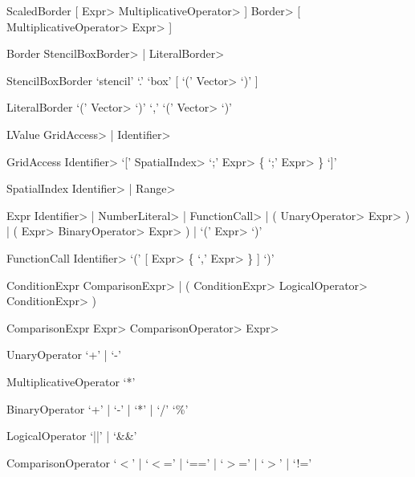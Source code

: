 \begin{EBNF}
	\item[ScaledBorder]
		[ \<Expr> \<MultiplicativeOperator> ] \<Border> [ \<MultiplicativeOperator> \<Expr> ]
	\item[Border]
		\<StencilBoxBorder> | \<LiteralBorder>
	\item[StencilBoxBorder]
		`stencil' `.' `box' [ `(' \<Vector> `)' ]
	\item[LiteralBorder]
		`(' \<Vector> `)' `,' `(' \<Vector> `)'

 	\item[LValue]
		\<GridAccess> | \<Identifier>
	\item[GridAccess]
		\<Identifier> `[' \<SpatialIndex> `;' \<Expr> \{ `;' \<Expr> \} `]'
	\item[SpatialIndex]
		\<Identifier> | \<Range>
		
	\item[Expr]
		\<Identifier> | \<NumberLiteral> | \<FunctionCall> | ( \<UnaryOperator> \<Expr> ) | ( \<Expr> \<BinaryOperator> \<Expr> ) | `(' \<Expr> `)'
	\item[FunctionCall]
		\<Identifier> `(' [ \<Expr> \{ `,' \<Expr> \} ] `)'
	\item[ConditionExpr]
		\<ComparisonExpr> | ( \<ConditionExpr> \<LogicalOperator> \<ConditionExpr> )
	\item[ComparisonExpr]
		\<Expr> \<ComparisonOperator> \<Expr>
    
	\item[UnaryOperator]
		`+' | `-'
	\item[MultiplicativeOperator]
		`*'
	\item[BinaryOperator]
		`+' | `-' | `*' | `/' `\%'
	\item[LogicalOperator]
		`||' | `\&\&'
	\item[ComparisonOperator]
		`$<$' | `$<$=' | `==' | `$>$=' | `$>$' | `!='
\end{EBNF}

